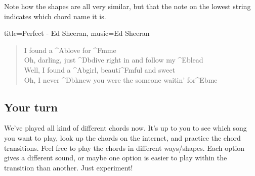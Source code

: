 Note how the shapes are all very similar, but that the note on the lowest string indicates which chord name it is.


\begin{song}[verse/numbered, align-chords=l]{title={Perfect - Ed Sheeran}, music={Ed Sheeran}}
	\begin{verse}
		I found a ^{Ab}love for ^{Fm}me \\
		Oh, darling, just ^{Db}dive right in and follow my ^{Eb}lead \\
		Well, I found a ^{Ab}girl, beauti^{Fm}ful and sweet \\
		Oh, I never ^{Db}knew you were the someone waitin' for^{Eb}me \\
	\end{verse}
\end{song}

\subsection{Your turn}

We've played all kind of different chords now. It's up to you to see which song you want to play, look up the chords on the internet, and practice the chord transitions. Feel free to play the chords in different ways/shapes. Each option gives a different sound, or maybe one option is easier to play within the transition than another. Just experiment!